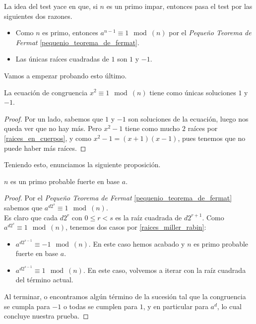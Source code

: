 La idea del test yace en que, si $n$ es un primo impar, entonces pasa el test por las siguientes dos razones.

\begin{itemize}
	\item Como $n$ es primo, entonces $a^{n-1} \equiv 1 \mod(n)$ por el \textit{Pequeño Teorema de Fermat} \ref{pequenio_teorema_de_fermat}.
	
	\item Las únicas raíces cuadradas de $1$ son $1$ y $-1$.
\end{itemize}

Vamos a empezar probando esto último.

\begin{proposicion}\label{raices_miller_rabin}
	La ecuación de congruencia $x^2 \equiv 1 \mod(n)$ tiene como únicas soluciones $1$ y $-1$.
\end{proposicion}

\begin{proof}
	Por un lado, sabemos que $1$ y $-1$ son soluciones de la ecuación, luego nos queda ver que no hay más. Pero $x^2 - 1$ tiene como mucho $2$ raíces por \autoref{raices_en_cuerpos}, y como $x^2 - 1 = (x + 1)(x - 1)$, pues tenemos que no puede haber más raíces.
\end{proof}

Teniendo esto, enunciamos la siguiente proposición.

\begin{proposicion}\label{proposicion_miller_rabin}
	$n$ es un primo probable fuerte en base $a$.
\end{proposicion}

\begin{proof}
	Por el \textit{Pequeño Teorema de Fermat} \ref{pequenio_teorema_de_fermat} sabemos que $a^{d2^s} \equiv 1 \mod(n)$.\\
	
	Es claro que cada $d2^r$ con $0 \leq r < s$ es la raíz cuadrada de $d2^{r+1}$. Como $a^{d2^s} \equiv 1 \mod(n)$, tenemos dos casos por \autoref{raices_miller_rabin}:
	
	\begin{itemize}
		\item $a^{d2^{s-1}} \equiv -1 \mod(n)$. En este caso hemos acabado y $n$ es primo probable fuerte en base $a$.
		
		\item $a^{d2^{s-1}} \equiv 1 \mod(n)$. En este caso, volvemos a iterar con la raíz cuadrada del término actual.
	\end{itemize}
	
	Al terminar, o encontramos algún término de la sucesión tal que la congruencia se cumpla para $-1$ o todas se cumplen para $1$, y en particular para $a^d$, lo cual concluye nuestra prueba.
\end{proof}

